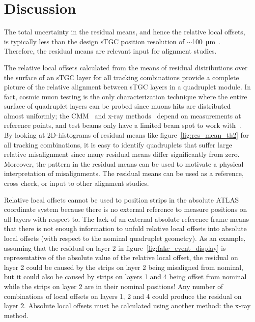 \section{Discussion}

The total uncertainty in the residual means, and hence the relative local offsets, is typically less than the design sTGC position resolution of $\sim$\SI{100}{\micro\meter}~\cite{nsw_tdr}. Therefore, the residual means are relevant input for alignment studies.

The relative local offsets calculated from the means of residual distributions over the surface of an sTGC layer for all tracking combinations provide a complete picture of the relative alignment between sTGC layers in a quadruplet module. In fact, cosmic muon testing is the only characterization technique where the entire surface of quadruplet layers can be probed since muons hits are distributed almost uniformly; the CMM~\cite{carlson_results_2019} and x-ray methods~\cite{lefebvre_precision_2020} depend on measurements at reference points, and test beams only have a limited beam spot to work with~\cite{abusleme_performance_2016}. By looking at 2D-histograms of residual means like figure~\ref{fig:res_mean_th2} for all tracking combinations, it is easy to identify quadruplets that suffer large relative misalignment since many residual means differ significantly from zero. Moreover, the pattern in the residual means can be used to motivate a physical interpretation of misalignments. The residual means can be used as a reference, cross check, or input to other alignment studies.

Relative local offsets cannot be used to position strips in the absolute ATLAS coordinate system because there is no external reference to measure positions on all layers with respect to. The lack of an external absolute reference frame means that there is not enough information to unfold relative local offsets into absolute local offsets (with respect to the nominal quadruplet geometry). As an example, assuming that the residual on layer 2 in figure~\ref{fig:fake_event_display} is representative of the absolute value of the relative local offset, the residual on layer 2 could be caused by the strips on layer 2 being misaligned from nominal, but it could also be caused by strips on layers 1 and 4 being offset from nominal while the strips on layer 2 are in their nominal positions! Any number of combinations of local offsets on layers 1, 2 and 4 could produce the residual on layer 2. Absolute local offsets must be calculated using another method: the x-ray method.